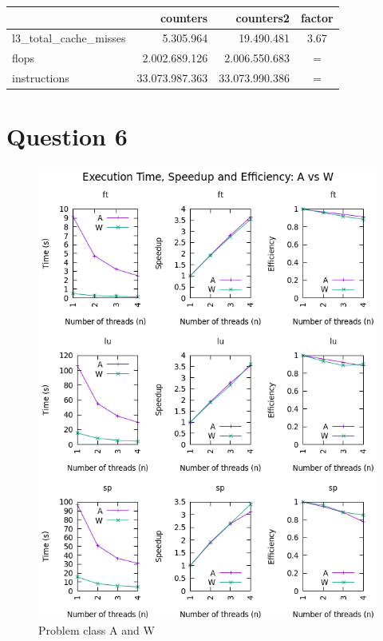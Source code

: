 \documentclass[12pt]{article}
\begin{document}
\begin{tabular}{|l|r|r|c|}
	\hline
	& counters & counters2 & factor \\
	\hline
	l3\_total\_cache\_misses & 5.305.964 & 19.490.481 & 3.67 \\
	flops & 2.002.689.126 & 2.006.550.683 & = \\
	instructions & 33.073.987.363 & 33.073.990.386 & = \\
	\hline
\end{tabular}

\newpage

\section*{Question 6}

\begin{figure}[h!]
	\centering
	\includegraphics[width=0.9\linewidth]{ptse.png}
	\caption{Problem class A and W}
	\label{fig:aw}
\end{figure}

\newpage
\end{document}
